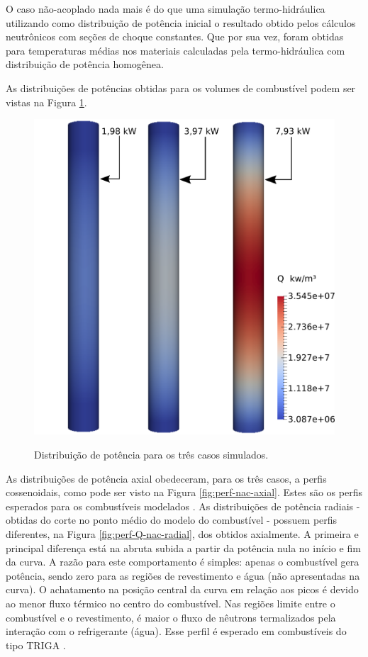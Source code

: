 O caso não-acoplado nada mais é do que uma simulação termo-hidráulica utilizando como distribuição de potência
inicial o resultado obtido pelos cálculos neutrônicos com seções de choque constantes. Que por sua vez, foram
obtidas para temperaturas médias nos materiais calculadas pela termo-hidráulica com distribuição de potência
homogênea.

As distribuições de potências obtidas para os volumes de combustível podem ser vistas na Figura \ref{fig:pot-nc}.

\begin{figure}[htb]
  \caption[Distribuição de potência para os três casos simulados.]{Distribuição de potência para os três casos simulados.}
  \centering\includegraphics[scale=0.5]{figuras/Q_fuel_all_NC.png}
  \label{fig:pot-nc}
\end{figure}

As distribuições de potência axial obedeceram, para os três casos, a perfis
cossenoidais, como pode ser visto na Figura \ref{fig:perf-nac-axial}. Estes são os perfis esperados para
os combustíveis modelados \cite{Veloso2005}. As distribuições de potência radiais -
obtidas do corte no ponto médio do modelo do combustível - possuem perfis diferentes, na Figura \ref{fig:perf-Q-nac-radial},
dos obtidos axialmente. A primeira e principal diferença está na abruta subida a partir da potência nula
no início e fim da curva. A razão para este comportamento é simples: apenas o combustível gera potência, sendo
zero para as regiões de revestimento e água (não apresentadas na curva). O achatamento na posição central
da curva em relação aos picos é devido ao menor fluxo térmico no centro do combustível. Nas regiões limite
entre o combustível e o revestimento, é maior o fluxo de nêutrons termalizados pela interação com o refrigerante (água).
Esse perfil é esperado em combustíveis do tipo TRIGA \cite{Ravnik1990}.

